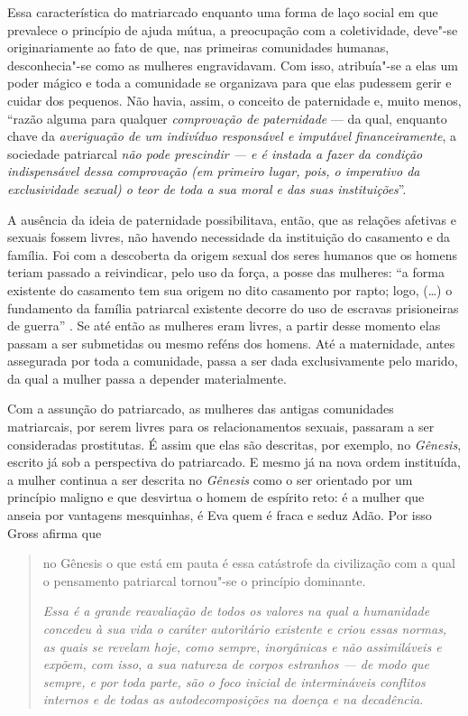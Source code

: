 Essa característica do matriarcado enquanto uma forma de laço social em
que prevalece o princípio de ajuda mútua, a preocupação com a
coletividade, deve"-se originariamente ao fato de que, nas primeiras
comunidades humanas, desconhecia"-se como as mulheres engravidavam. Com
isso, atribuía"-se a elas um poder mágico e toda a comunidade se
organizava para que elas pudessem gerir e cuidar dos pequenos. Não
havia, assim, o conceito de paternidade e, muito menos, ``razão alguma
para qualquer \emph{comprovação de paternidade} --- da qual, enquanto
chave da \emph{averiguação de um indivíduo responsável e imputável
financeiramente}, a sociedade patriarcal \emph{não pode prescindir --- e
é instada a fazer da condição indispensável dessa comprovação (em
primeiro lugar, pois, o imperativo da exclusividade sexual) o teor de
toda a sua moral e das suas instituições}''.

A ausência da ideia de paternidade possibilitava, então, que as relações
afetivas e sexuais fossem livres, não havendo necessidade da instituição
do casamento e da família. Foi com a descoberta da origem sexual dos
seres humanos que os homens teriam passado a reivindicar, pelo uso da
força, a posse das mulheres: ``a forma existente do casamento tem sua
origem no dito casamento por rapto; logo, (\ldots{}) o fundamento da família
patriarcal existente decorre do uso de escravas prisioneiras de guerra''
. Se até então as mulheres eram livres, a partir desse momento elas
passam a ser submetidas ou mesmo reféns dos homens. Até a maternidade,
antes assegurada por toda a comunidade, passa a ser dada exclusivamente
pelo marido, da qual a mulher passa a depender materialmente.

Com a assunção do patriarcado, as mulheres das antigas comunidades
matriarcais, por serem livres para os relacionamentos sexuais, passaram
a ser consideradas prostitutas. É assim que elas são descritas, por
exemplo, no \emph{Gênesis}, escrito já sob a perspectiva do patriarcado.
E mesmo já na nova ordem instituída, a mulher continua a ser descrita no
\emph{Gênesis} como o ser orientado por um princípio maligno e que
desvirtua o homem de espírito reto: é a mulher que anseia por vantagens
mesquinhas, é Eva quem é fraca e seduz Adão. Por isso Gross afirma que

\begin{quote}
no Gênesis o que está em pauta é essa catástrofe da civilização com a
qual o pensamento patriarcal tornou"-se o princípio dominante.

\emph{Essa é a grande reavaliação de todos os valores na qual a
humanidade concedeu à sua vida o caráter autoritário existente e criou
essas normas, as quais se revelam hoje, como sempre, inorgânicas e não
assimiláveis e expõem, com isso, a sua natureza de corpos estranhos ---
de modo que sempre, e por toda parte, são o foco inicial de
intermináveis conflitos internos e de todas as autodecomposições na
doença e na decadência}.
\end{quote}

